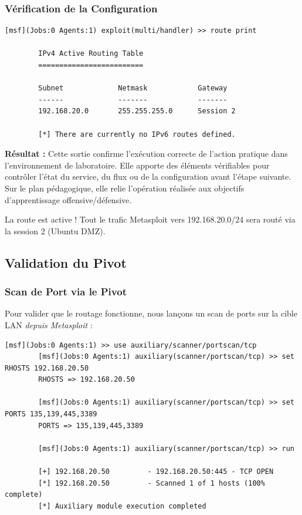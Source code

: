 \documentclass[12pt,a4paper,openany]{report}
\begin{document}
	\subsubsection{Vérification de la Configuration}
	
	\begin{lstlisting}[caption=Affichage de la Table de Routage]
		[msf](Jobs:0 Agents:1) exploit(multi/handler) >> route print
		
		IPv4 Active Routing Table
		=========================
		
		Subnet             Netmask            Gateway
		------             -------            -------
		192.168.20.0       255.255.255.0      Session 2
		
		[*] There are currently no IPv6 routes defined.
	\end{lstlisting}
	
	\textbf{Résultat :} Cette sortie confirme l'exécution correcte de l'action pratique dans l'environnement de laboratoire. Elle apporte des éléments vérifiables pour contrôler l'état du service, du flux ou de la configuration avant l'étape suivante. Sur le plan pédagogique, elle relie l'opération réalisée aux objectifs d'apprentissage offensive/défensive.
	
	
	\textcolor{green}{\checkmark} La route est active ! Tout le trafic Metasploit vers 192.168.20.0/24 sera routé via la session 2 (Ubuntu DMZ).
	
	\subsection{Validation du Pivot}
	
	\subsubsection{Scan de Port via le Pivot}
	
	Pour valider que le routage fonctionne, nous lançons un scan de ports sur la cible LAN \textit{depuis Metasploit} :
	
	\begin{lstlisting}[caption=Port Scan via Metasploit Auxiliary]
		[msf](Jobs:0 Agents:1) >> use auxiliary/scanner/portscan/tcp
		[msf](Jobs:0 Agents:1) auxiliary(scanner/portscan/tcp) >> set RHOSTS 192.168.20.50
		RHOSTS => 192.168.20.50
		
		[msf](Jobs:0 Agents:1) auxiliary(scanner/portscan/tcp) >> set PORTS 135,139,445,3389
		PORTS => 135,139,445,3389
		
		[msf](Jobs:0 Agents:1) auxiliary(scanner/portscan/tcp) >> run
		
		[+] 192.168.20.50         - 192.168.20.50:445 - TCP OPEN
		[*] 192.168.20.50         - Scanned 1 of 1 hosts (100% complete)
		[*] Auxiliary module execution completed
	\end{lstlisting}
	
\end{document}
